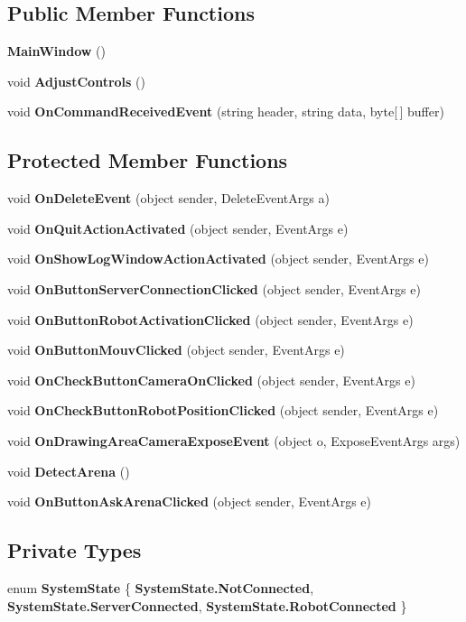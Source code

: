 \subsection*{Public Member Functions}
\begin{DoxyCompactItemize}
\item 
\textbf{ Main\+Window} ()
\item 
void \textbf{ Adjust\+Controls} ()
\item 
void \textbf{ On\+Command\+Received\+Event} (string header, string data, byte[$\,$] buffer)
\end{DoxyCompactItemize}
\subsection*{Protected Member Functions}
\begin{DoxyCompactItemize}
\item 
void \textbf{ On\+Delete\+Event} (object sender, Delete\+Event\+Args a)
\item 
void \textbf{ On\+Quit\+Action\+Activated} (object sender, Event\+Args e)
\item 
void \textbf{ On\+Show\+Log\+Window\+Action\+Activated} (object sender, Event\+Args e)
\item 
void \textbf{ On\+Button\+Server\+Connection\+Clicked} (object sender, Event\+Args e)
\item 
void \textbf{ On\+Button\+Robot\+Activation\+Clicked} (object sender, Event\+Args e)
\item 
void \textbf{ On\+Button\+Mouv\+Clicked} (object sender, Event\+Args e)
\item 
void \textbf{ On\+Check\+Button\+Camera\+On\+Clicked} (object sender, Event\+Args e)
\item 
void \textbf{ On\+Check\+Button\+Robot\+Position\+Clicked} (object sender, Event\+Args e)
\item 
void \textbf{ On\+Drawing\+Area\+Camera\+Expose\+Event} (object o, Expose\+Event\+Args args)
\item 
void \textbf{ Detect\+Arena} ()
\item 
void \textbf{ On\+Button\+Ask\+Arena\+Clicked} (object sender, Event\+Args e)
\end{DoxyCompactItemize}
\subsection*{Private Types}
\begin{DoxyCompactItemize}
\item 
enum \textbf{ System\+State} \{ \textbf{ System\+State.\+Not\+Connected}, 
\textbf{ System\+State.\+Server\+Connected}, 
\textbf{ System\+State.\+Robot\+Connected}
 \}
\end{DoxyCompactItemize}
